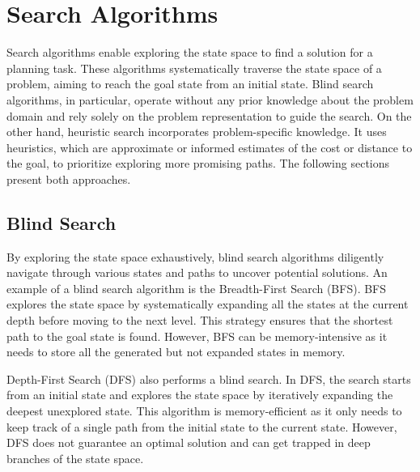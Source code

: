 \section{Search Algorithms}
\label{sec:background_searchalgorithms}

Search algorithms enable exploring the state space to find a solution for a planning task. These algorithms systematically traverse the state space of a problem, aiming to reach the goal state from an initial state. Blind search algorithms, in particular, operate without any prior knowledge about the problem domain and rely solely on the problem representation to guide the search. On the other hand, heuristic search incorporates problem-specific knowledge. It uses heuristics, which are approximate or informed estimates of the cost or distance to the goal, to prioritize exploring more promising paths. The following sections present both approaches.

\subsection{Blind Search}
\label{sec:background_blindsearch}

By exploring the state space exhaustively, blind search algorithms diligently navigate through various states and paths to uncover potential solutions. An example of a blind search algorithm is the Breadth-First Search (BFS). BFS explores the state space by systematically expanding all the states at the current depth before moving to the next level. This strategy ensures that the shortest path to the goal state is found. However, BFS can be memory-intensive as it needs to store all the generated but not expanded states in memory.

Depth-First Search (DFS) also performs a blind search. In DFS, the search starts from an initial state and explores the state space by iteratively expanding the deepest unexplored state. This algorithm is memory-efficient as it only needs to keep track of a single path from the initial state to the current state. However, DFS does not guarantee an optimal solution and can get trapped in deep branches of the state space.

